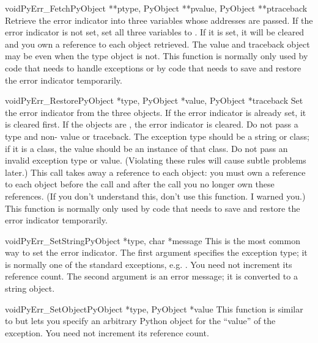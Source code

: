 \documentclass{manual}
\begin{document}
\begin{cfuncdesc}{void}{PyErr_Fetch}{PyObject **ptype, PyObject **pvalue,
                                     PyObject **ptraceback}
Retrieve the error indicator into three variables whose addresses are
passed.  If the error indicator is not set, set all three variables to
\NULL{}.  If it is set, it will be cleared and you own a reference to
each object retrieved.  The value and traceback object may be
\NULL{} even when the type object is not.    This
function is normally only used by code that needs to handle exceptions
or by code that needs to save and restore the error indicator
temporarily.
\end{cfuncdesc}

\begin{cfuncdesc}{void}{PyErr_Restore}{PyObject *type, PyObject *value,
                                       PyObject *traceback}
Set  the error indicator from the three objects.  If the error
indicator is already set, it is cleared first.  If the objects are
\NULL{}, the error indicator is cleared.  Do not pass a \NULL{} type
and non-\NULL{} value or traceback.  The exception type should be a
string or class; if it is a class, the value should be an instance of
that class.  Do not pass an invalid exception type or value.
(Violating these rules will cause subtle problems later.)  This call
takes away a reference to each object: you must own a reference
to each object before the call and after the call you no longer own
these references.  (If you don't understand this, don't use this
function.  I warned you.)    This function is normally
only used by code that needs to save and restore the error indicator
temporarily.
\end{cfuncdesc}

\begin{cfuncdesc}{void}{PyErr_SetString}{PyObject *type, char *message}
This is the most common way to set the error indicator.  The first
argument specifies the exception type; it is normally one of the
standard exceptions, e.g. .  You need not
increment its reference count.  The second argument is an error
message; it is converted to a string object.
\end{cfuncdesc}

\begin{cfuncdesc}{void}{PyErr_SetObject}{PyObject *type, PyObject *value}
This function is similar to  but lets you
specify an arbitrary Python object for the ``value'' of the exception.
You need not increment its reference count.
\end{cfuncdesc}
\end{document}
